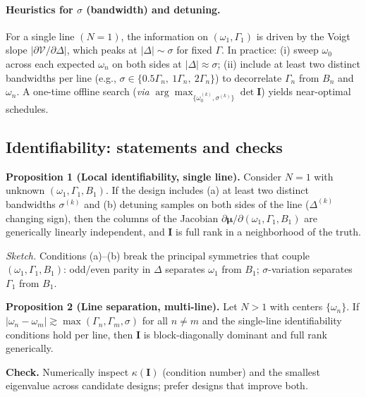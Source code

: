 \documentclass[aip,jap,preprint,amsmath,amssymb]{revtex4-2} %
\begin{document}
        \paragraph*{Heuristics for $\sigma$ (bandwidth) and detuning.}
            For a single line $(N=1)$, the information on $(\omega_1,\Gamma_1)$ is driven by the Voigt slope
            $|\partial \mathcal{V}/\partial \Delta|$, which peaks at $|\Delta|\sim \sigma$ for fixed $\Gamma$.
            In practice:
            (i) sweep $\omega_0$ across each expected $\omega_n$ on both sides at $|\Delta|\approx\sigma$;
            (ii) include at least two distinct bandwidths per line (e.g., $\sigma\in\{0.5\Gamma_n,\ 1\Gamma_n,\ 2\Gamma_n\}$)
            to decorrelate $\Gamma_n$ from $B_n$ and $\omega_n$.
            A one-time offline search (\emph{via} $\arg\max_{\{\omega_0^{(k)},\sigma^{(k)}\}} \det\mathbf I$) yields near-optimal schedules.

\subsection{Identifiability: statements and checks}
    \textbf{Proposition 1 (Local identifiability, single line).}
    Consider $N=1$ with unknown $(\omega_1,\Gamma_1,B_1)$.
    If the design includes (a) at least two distinct bandwidths $\sigma^{(k)}$ and
    (b) detuning samples on both sides of the line ($\Delta^{(k)}$ changing sign),
    then the columns of the Jacobian $\partial \boldsymbol{\mu}/\partial(\omega_1,\Gamma_1,B_1)$
    are generically linearly independent, and $\mathbf I$ is full rank in a neighborhood of the truth.

    \emph{Sketch.} Conditions (a)–(b) break the principal symmetries that couple $(\omega_1,\Gamma_1,B_1)$:
    odd/even parity in $\Delta$ separates $\omega_1$ from $B_1$; $\sigma$-variation separates $\Gamma_1$ from $B_1$.

    \textbf{Proposition 2 (Line separation, multi-line).}
    Let $N>1$ with centers $\{\omega_n\}$. If $|\omega_n-\omega_m|\gtrsim\max(\Gamma_n,\Gamma_m,\sigma)$
    for all $n\neq m$ and the single-line identifiability conditions hold per line, then
    $\mathbf I$ is block-diagonally dominant and full rank generically.

    \textbf{Check.} Numerically inspect $\kappa(\mathbf I)$ (condition number) and the smallest eigenvalue across candidate designs; prefer designs that improve both.
\end{document}

